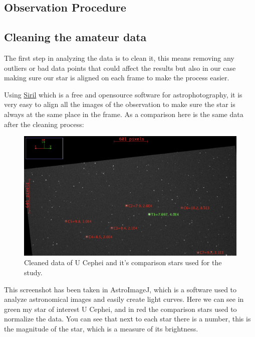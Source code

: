 \documentclass[12pt,a4paper]{article}
\begin{document}
\subsection{Observation Procedure}

\subsection{Cleaning the amateur data}


The first step in analyzing the data is to clean it, this means removing any outliers or bad data points that could affect the results but also in our case making sure our star is aligned on each frame to make the process easier.

\bigskip


Using \href{https://siril.org/fr/}{Siril} which is a free and opensource software for astrophotography, it is very easy to align all the images of the observation to make sure the star is always at the same place in the frame.
As a comparison here is the same data after the cleaning process:

\begin{figure}[H]
    \centering
    \includegraphics[width=1\textwidth]{assets/aligned.png}
    \caption{Cleaned data of U Cephei and it's comparison stars used for the study.}
    \label{fig:cleaned_data}
\end{figure}

This screenshot has been taken in AstroImageJ, which is a software used to analyze astronomical images and easily create light curves.
Here we can see in green my star of interest U Cephei, and in red the comparison stars used to normalize the data.
You can see that next to each star there is a number, this is the magnitude of the star, which is a measure of its brightness.
\end{document}
